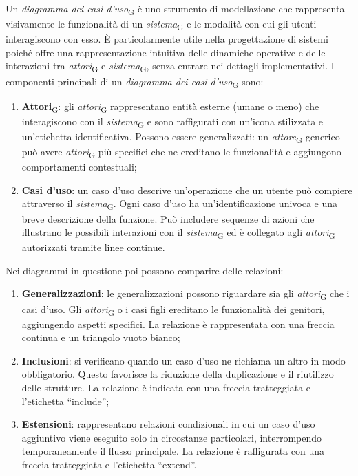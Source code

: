 Un \textit{diagramma dei casi d’uso}\textsubscript{G} è uno strumento di modellazione che rappresenta visivamente le funzionalità di un \textit{sistema}\textsubscript{G} e le modalità con cui gli utenti interagiscono con esso. È particolarmente utile nella progettazione di sistemi poiché offre una rappresentazione intuitiva delle dinamiche operative e delle interazioni tra \textit{attori}\textsubscript{G} e \textit{sistema}\textsubscript{G}, senza entrare nei dettagli implementativi.
I componenti principali di un \textit{diagramma dei casi d’uso}\textsubscript{G} sono: 
\begin{enumerate}
    \item \textbf{Attori}\textsubscript{G}: gli \textit{attori}\textsubscript{G} rappresentano entità esterne (umane o meno) che interagiscono con il \textit{sistema}\textsubscript{G} e sono raffigurati con un’icona stilizzata e un’etichetta identificativa. Possono essere generalizzati: un \textit{attore}\textsubscript{G} generico può avere \textit{attori}\textsubscript{G} più specifici che ne ereditano le funzionalità e aggiungono comportamenti contestuali;
    \item \textbf{Casi d'uso}: un caso d’uso descrive un'operazione che un utente può compiere attraverso il \textit{sistema}\textsubscript{G}. Ogni caso d’uso ha un'identificazione univoca e una breve descrizione della funzione. Può includere sequenze di azioni che illustrano le possibili interazioni con il \textit{sistema}\textsubscript{G} ed è collegato agli \textit{attori}\textsubscript{G} autorizzati tramite linee continue.
\end{enumerate}
Nei diagrammi in questione poi possono comparire delle relazioni:
\begin{enumerate}
    \item \textbf{Generalizzazioni}: le generalizzazioni possono riguardare sia gli \textit{attori}\textsubscript{G} che i casi d’uso. Gli \textit{attori}\textsubscript{G} o i casi figli ereditano le funzionalità dei genitori, aggiungendo aspetti specifici. La relazione è rappresentata con una freccia continua e un triangolo vuoto bianco;
    \item \textbf{Inclusioni}: si verificano quando un caso d’uso ne richiama un altro in modo obbligatorio. Questo favorisce la riduzione della duplicazione e il riutilizzo delle strutture. La relazione è indicata con una freccia tratteggiata e l’etichetta “include”;
    \item \textbf{Estensioni}: rappresentano relazioni condizionali in cui un caso d’uso aggiuntivo viene eseguito solo in circostanze particolari, interrompendo temporaneamente il flusso principale. La relazione è raffigurata con una freccia tratteggiata e l’etichetta “extend”.
\end{enumerate}

